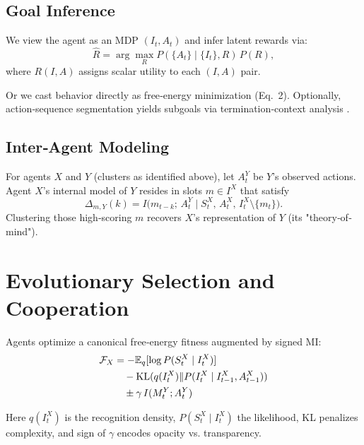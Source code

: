 \documentclass[10pt,conference]{IEEEtran}
\begin{document}
\subsection{Goal Inference}
We view the agent as an MDP $(I_t,A_t)$ and infer latent rewards via:
\[
\hat R = \arg\max_R P(\{A_t\}\mid\{I_t\},R)\,P(R),
\]
where $R(I,A)$ assigns scalar utility to each $(I,A)$ pair.

Or we cast behavior directly as free‐energy minimization (Eq.~2).
Optionally, action‐sequence segmentation yields subgoals via termination‐context analysis \cite{NgRussell2000,Ziebart2008}.


\subsection{Inter‐Agent Modeling}
For agents $X$ and $Y$ (clusters as identified above), let $A^Y_t$ be $Y$'s observed actions.  Agent $X$'s internal model of $Y$ resides in slots $m\in I^X$ that satisfy
\[
\Delta_{m,Y}(k)
=
I\bigl(m_{t-k};\,A^Y_t\mid S^X_t,\,A^X_t,\,I^X_t\setminus\{m_t\}\bigr).
\]
Clustering those high‐scoring $m$ recovers $X$'s representation of $Y$ (its "theory‐of‐mind").


\section{Evolutionary Selection and Cooperation}
Agents optimize a canonical free‐energy fitness augmented by signed MI:
\begin{align}
\mathcal F_X &= -\mathbb{E}_q[\log P(S^X_t\mid I^X_t)] \notag \\
&\quad - \mathrm{KL}(q(I^X_t)\|P(I^X_t\mid I^X_{t-1},A^X_{t-1})) \notag \\
&\quad \pm\gamma\,I(M^Y_t;A^Y_t)
\end{align}

Here $q(I^X_t)$ is the recognition density, $P(S^X_t\mid I^X_t)$ the likelihood, KL penalizes complexity, and sign of $\gamma$ encodes opacity vs. transparency.
\end{document}
